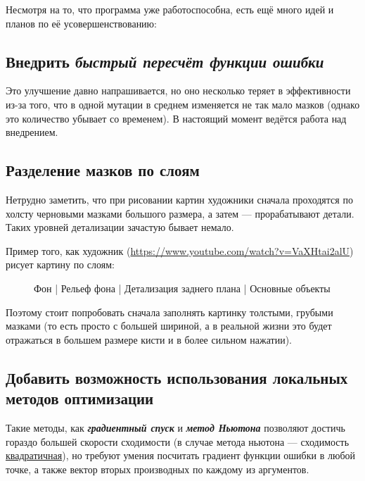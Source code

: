 Несмотря на то, что программа уже работоспособна, есть ещё много идей и планов по её усовершенствованию:


 \subsection{Внедрить \textit{быстрый пересчёт функции ошибки}}
Это улучшение давно напрашивается,
но оно несколько теряет в эффективности из-за того, что в одной мутации в среднем изменяется
не так мало мазков (однако это количество убывает со временем).
В настоящий момент ведётся работа над внедрением.

\subsection{Разделение мазков по слоям}
 Нетрудно заметить, что при рисовании картин художники сначала проходятся по холсту черновыми мазками большого размера, а затем — прорабатывают детали.
 Таких уровней детализации зачастую бывает немало.

 Пример того, как художник (\href{https://www.youtube.com/watch?v=VaXHtai2alU}{https://www.youtube.com/watch?v=VaXHtai2alU}) рисует картину по слоям:

\begin{figure}[h!]
    \centering
    \caption{ Фон | Рельеф фона | Детализация заднего плана | Основные объекты}
    \label{fig:layered_painting}
\end{figure}


Поэтому стоит попробовать сначала заполнять картинку толстыми, грубыми мазками
(то есть просто с большей шириной, а в реальной жизни это будет отражаться в большем размере кисти и в более сильном нажатии).

\subsection{Добавить возможность использования локальных методов оптимизации}
Такие методы, как \textbf\textit{{градиентный спуск}} и \textbf\textit{{метод Ньютона}} позволяют достичь гораздо большей скорости сходимости
(в случае метода ньютона — сходимость \href{http://w.ict.nsc.ru/books/textbooks/akhmerov/mo_unicode/4.html}{квадратичная}),
но требуют умения посчитать градиент функции ошибки в любой точке, а также вектор вторых производных по каждому из аргументов.

